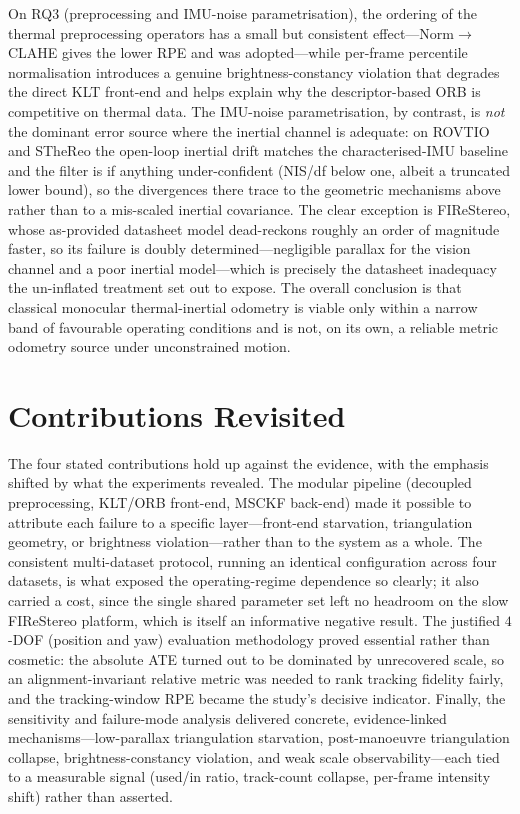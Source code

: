 On RQ3 (preprocessing and IMU-noise parametrisation), the ordering of the thermal preprocessing operators has a small but consistent effect---Norm$\rightarrow$CLAHE gives the lower RPE and was adopted---while per-frame percentile normalisation introduces a genuine brightness-constancy violation that degrades the direct KLT front-end and helps explain why the descriptor-based ORB is competitive on thermal data. The IMU-noise parametrisation, by contrast, is \emph{not} the dominant error source where the inertial channel is adequate: on ROVTIO and STheReo the open-loop inertial drift matches the characterised-IMU baseline and the filter is if anything under-confident (NIS/df below one, albeit a truncated lower bound), so the divergences there trace to the geometric mechanisms above rather than to a mis-scaled inertial covariance. The clear exception is FIReStereo, whose as-provided datasheet model dead-reckons roughly an order of magnitude faster, so its failure is doubly determined---negligible parallax for the vision channel and a poor inertial model---which is precisely the datasheet inadequacy the un-inflated treatment set out to expose. The overall conclusion is that classical monocular thermal-inertial odometry is viable only within a narrow band of favourable operating conditions and is not, on its own, a reliable metric odometry source under unconstrained motion.

\section{Contributions Revisited}
\label{sec:c_contributions}
The four stated contributions hold up against the evidence, with the emphasis shifted by what the experiments revealed. The modular pipeline (decoupled preprocessing, KLT/ORB front-end, MSCKF back-end) made it possible to attribute each failure to a specific layer---front-end starvation, triangulation geometry, or brightness violation---rather than to the system as a whole. The consistent multi-dataset protocol, running an identical configuration across four datasets, is what exposed the operating-regime dependence so clearly; it also carried a cost, since the single shared parameter set left no headroom on the slow FIReStereo platform, which is itself an informative negative result. The justified $4$-DOF (position and yaw) evaluation methodology proved essential rather than cosmetic: the absolute ATE turned out to be dominated by unrecovered scale, so an alignment-invariant relative metric was needed to rank tracking fidelity fairly, and the tracking-window RPE became the study's decisive indicator. Finally, the sensitivity and failure-mode analysis delivered concrete, evidence-linked mechanisms---low-parallax triangulation starvation, post-manoeuvre triangulation collapse, brightness-constancy violation, and weak scale observability---each tied to a measurable signal (used/in ratio, track-count collapse, per-frame intensity shift) rather than asserted.

